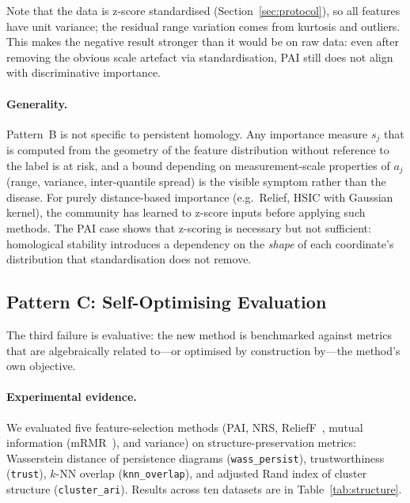 Note that the data is z-score standardised (Section~\ref{sec:protocol}), so
all features have unit variance; the residual range variation comes from
kurtosis and outliers.  This makes the negative result stronger
than it would be on raw data: even after removing the obvious scale artefact
via standardisation, PAI still does not align with discriminative importance.

\paragraph{Generality.}
Pattern~B is not specific to persistent homology.  Any importance measure
$s_j$ that is computed from the geometry of the feature distribution without
reference to the label is at risk, and a bound depending on measurement-scale
properties of $a_j$ (range, variance, inter-quantile spread) is the visible
symptom rather than the disease.  For purely
distance-based importance (e.g.\ Relief, HSIC with Gaussian kernel), the
community has learned to z-score inputs before applying such methods.  The
PAI case shows that z-scoring is necessary but not sufficient: homological
stability introduces a dependency on the \emph{shape} of each coordinate's
distribution that standardisation does not remove.

\subsection{Pattern C: Self-Optimising Evaluation}
\label{sec:patC}

The third failure is evaluative: the new method is benchmarked against metrics
that are algebraically related to---or optimised by construction by---the
method's own objective.

\paragraph{Experimental evidence.}
We evaluated five feature-selection methods (PAI, NRS,
ReliefF~\cite{Kononenko1994,RobnikKononenko2003}, mutual information
(mRMR~\cite{Peng2005mRMR}), and variance) on structure-preservation metrics: Wasserstein distance
of persistence diagrams (\texttt{wass\_persist}), trustworthiness
(\texttt{trust}), $k$-NN overlap (\texttt{knn\_overlap}), and adjusted Rand
index of cluster structure (\texttt{cluster\_ari}).
Results across ten datasets are in Table~\ref{tab:structure}.

